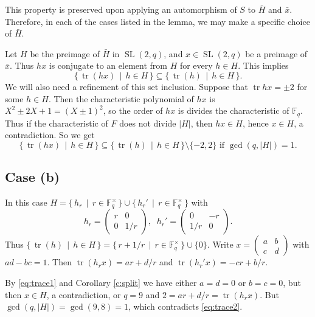 \documentclass[12pt]{amsart}
\theoremstyle{plain}
\theoremstyle{definition}
\numberwithin{equation}{section}
\newcommand{\abs}[1]{\lvert#1\rvert}
\newcommand*{\set}[1]{\{#1\}}
\newcommand*{\defset}[2]{\{\,#1\,\mid\,#2\,\}}
\newcommand{\FF}{\mathbb F}
\newcommand{\Fqs}{\FF_q^\times}
\newcommand{\bx}{\bar{x}}
\newcommand{\bH}{\bar{H}}
\DeclareMathOperator{\SL}{SL}
\DeclareMathOperator{\trace}{tr}
\begin{document}
This property is preserved upon applying an automorphism of $S$ to
$\bH$ and $\bx$. Therefore, in each of the cases listed in the
lemma, we may make a specific choice of $\bH$.

Let $H$ be the preimage of $\bH$ in $\SL(2, q)$, and
$x\in\SL(2, q)$ be a preimage of $\bx$. Thus $hx$ is conjugate to an
element from $H$ for every $h\in H$. This implies
\begin{equation}
  \label{eq:trace1}
  \defset{\trace(hx)}{h\in H}\subseteq%
  \defset{\trace(h)}{h\in H}.  
\end{equation}
We will also need a refinement of this set inclusion. Suppose that
$\trace{hx}=\pm2$ for some $h\in H$. Then the characteristic
polynomial of $hx$ is $X^2\pm2X+1=(X\pm1)^2$, so the order of
$hx$ is divides the characteristic of $\FF_q$. Thus if the
characteristic of $F$ does not divide $\abs{H}$, then
$hx\in H$, hence $x\in H$, a contradiction. So we get
\begin{equation}
  \label{eq:trace2}
  \defset{\trace(hx)}{h\in H}\subseteq%
  \defset{\trace(h)}{h\in H}\setminus\set{-2, 2}\text{ if }%
  \gcd(q, \abs{H})=1.
\end{equation}
\subsection{Case (b)}
In this case $H=\defset{h_r}{r\in\Fqs}\cup\defset{h_r'}{r\in\Fqs}$
with
\[
  h_r=\begin{pmatrix}r & 0\\0 & 1/r\end{pmatrix},\;\;
  h_r'=\begin{pmatrix}0 & -r\\1/r & 0\end{pmatrix}.\] Thus
$\defset{\trace(h)}{h\in H}=\defset{r+1/r}{r\in\Fqs}\cup\set{0}$. Write
$x=\begin{pmatrix}a & b\\c & d\end{pmatrix}$ with $ad-bc=1$. Then
$\trace(h_rx)=ar+d/r$ and $\trace(h_r'x)=-cr+b/r$.

By \eqref{eq:trace1} and Corollary \ref{c:split} we have either
$a=d=0$ or $b=c=0$, but then $x\in H$, a contradiction, or $q=9$ and
$2=ar+d/r=\trace(h_rx)$. But $\gcd(q, \abs{H})=\gcd(9, 8)=1$, which
contradicts \eqref{eq:trace2}.
\end{document}
